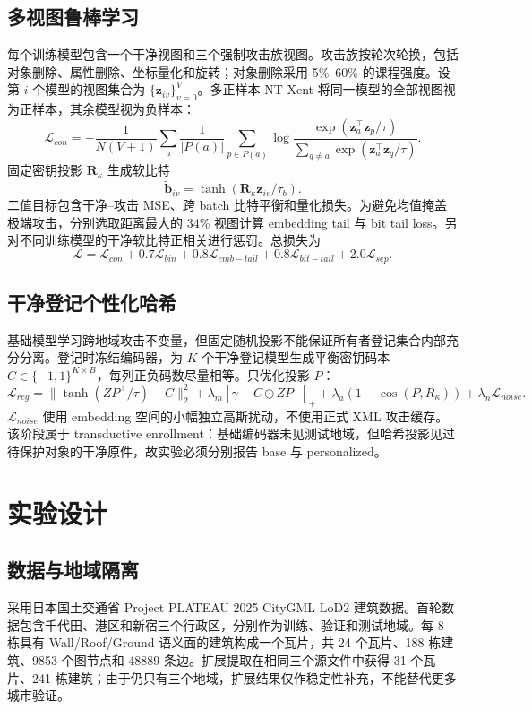 \documentclass[UTF8,fontset=fandol,12pt]{ctexart}
\begin{document}
\subsection{多视图鲁棒学习}
每个训练模型包含一个干净视图和三个强制攻击族视图。攻击族按轮次轮换，包括对象删除、属性删除、坐标量化和旋转；对象删除采用 5\%--60\% 的课程强度。设第 $i$ 个模型的视图集合为 $\{\bm z_{iv}\}_{v=0}^{V}$。多正样本 NT-Xent 将同一模型的全部视图视为正样本，其余模型视为负样本：
\begin{equation}
 \mathcal L_{con}=-\frac{1}{N(V+1)}\sum_a\frac{1}{|P(a)|}
 \sum_{p\in P(a)}\log\frac{\exp(\bm z_a^\top\bm z_p/\tau)}
 {\sum_{q\neq a}\exp(\bm z_a^\top\bm z_q/\tau)}.
\end{equation}
固定密钥投影 $\bm R_\kappa$ 生成软比特
\begin{equation}
 \widetilde{\bm b}_{iv}=\tanh(\bm R_\kappa\bm z_{iv}/\tau_b).
\end{equation}
二值目标包含干净--攻击 MSE、跨 batch 比特平衡和量化损失。为避免均值掩盖极端攻击，分别选取距离最大的 34\% 视图计算 embedding tail 与 bit tail loss。另对不同训练模型的干净软比特正相关进行惩罚。总损失为
\begin{equation}
 \mathcal L=\mathcal L_{con}+0.7\mathcal L_{bin}
 +0.8\mathcal L_{emb-tail}+0.8\mathcal L_{bit-tail}
 +2.0\mathcal L_{sep}.
\end{equation}

\subsection{干净登记个性化哈希}
基础模型学习跨地域攻击不变量，但固定随机投影不能保证所有者登记集合内部充分分离。登记时冻结编码器，为 $K$ 个干净登记模型生成平衡密钥码本 $C\in\{-1,1\}^{K\times B}$，每列正负码数尽量相等。只优化投影 $P$：
\begin{equation}
 \mathcal L_{reg}=\|\tanh(ZP^\top/\tau)-C\|_2^2
 +\lambda_m[\gamma-C\odot ZP^\top]_+
 +\lambda_a(1-\cos(P,R_\kappa))+\lambda_n\mathcal L_{noise}.
\end{equation}
$\mathcal L_{noise}$ 使用 embedding 空间的小幅独立高斯扰动，不使用正式 XML 攻击缓存。该阶段属于 transductive enrollment：基础编码器未见测试地域，但哈希投影见过待保护对象的干净原件，故实验必须分别报告 base 与 personalized。

\section{实验设计}
\subsection{数据与地域隔离}
采用日本国土交通省 Project PLATEAU 2025 CityGML LoD2 建筑数据。首轮数据包含千代田、港区和新宿三个行政区，分别作为训练、验证和测试地域。每 8 栋具有 Wall/Roof/Ground 语义面的建筑构成一个瓦片，共 24 个瓦片、188 栋建筑、9853 个图节点和 48889 条边。扩展提取在相同三个源文件中获得 31 个瓦片、241 栋建筑；由于仍只有三个地域，扩展结果仅作稳定性补充，不能替代更多城市验证。
\end{document}
